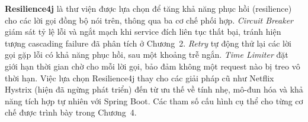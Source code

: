 \documentclass[../DoAn.tex]{subfiles}
\begin{document}
\textbf{Resilience4j} là thư viện được lựa chọn để tăng khả năng phục hồi (resilience) cho
các lời gọi đồng bộ nói trên, thông qua ba cơ chế phối hợp. \textit{Circuit Breaker} giám
sát tỷ lệ lỗi và ngắt mạch khi service đích liên tục thất bại, tránh hiện tượng cascading
failure đã phân tích ở Chương~2. \textit{Retry} tự động thử lại các lời gọi gặp lỗi có khả
năng phục hồi, sau một khoảng trễ ngắn. \textit{Time Limiter} đặt giới hạn thời gian chờ cho
mỗi lời gọi, bảo đảm không một request nào bị treo vô thời hạn. Việc lựa chọn Resilience4j
thay cho các giải pháp cũ như Netflix Hystrix (hiện đã ngừng phát triển) đến từ ưu thế về
tính nhẹ, mô-đun hóa và khả năng tích hợp tự nhiên với Spring Boot. Các tham số cấu hình cụ
thể cho từng cơ chế được trình bày trong Chương~4.

\end{document}
